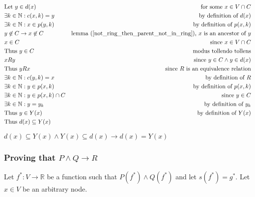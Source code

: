 \documentclass[11pt]{article}
\begin{document}
\begin{align*}
& \text{Let $y \in d(x)$} & \text{for some $x \in V \cap C$} \\
& \text{$\exists k \in \mathbb{N}: c(x,k)=y$} & \text{by definition of $d(x)$} \\
& \text{$\exists k \in \mathbb{N}: x\in p(y,k)$} & \text{by definition of $p(x,k)$} \\
& \text{$y \not \in C \rightarrow x \not \in C$} & \text{lemma (\ref{not_ring_then_parent_not_in_ring}), $x$ is an ancestor of $y$} \\
& \text{$x \in C$} & \text{since $x \in V \cap C$} \\
& \text{Thus $y\in C$} & \text{modus tollendo tollens} \\
& \text{$xRy$} & \text{since $y \in C \land y \in d(x)$} \\
& \text{Thus $yRx$} & \text{since $R$ is an equivalence relation} \\
& \text{$\exists k \in \mathbb{N}: c(y,k)=x$} & \text{by definition of $R$} \\
& \text{$\exists k \in \mathbb{N}: y\in p(x,k)$} & \text{by definition of $p(x,k)$} \\
& \text{$\exists k \in \mathbb{N}: y\in p(x,k) \cap C$} & \text{since $y \in C$} \\
& \text{$\exists k \in \mathbb{N}: y = y_{k}$} & \text{by definition of $y_{k}$} \\
& \text{Thus $y \in Y(x)$} & \text{by definition of $Y(x)$} \\
& \text{Thus $d(x) \subseteq Y(x)$} & \text{}
\end{align*}

$d(x) \subseteq Y(x) \land Y(x) \subseteq d(x) \rightarrow d(x)=Y(x)$

\subsubsection{Proving that $P\land Q\rightarrow R$}

Let $f^{*}: V \rightarrow \mathbb{R}$ be a function such that $P(f^{*})\land Q(f^{*})$ and let $s(f^{*}) = g^{*}$. Let $x\in V$ be an arbitrary node.
\end{document}
